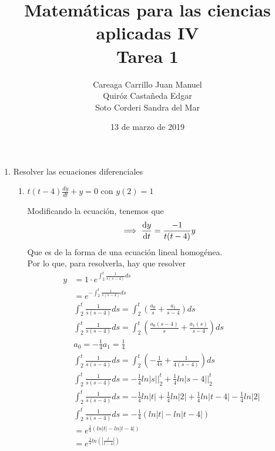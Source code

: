 \documentclass[14pt]{extarticle}
\begin{document}
    \title{
        Matemáticas para las ciencias aplicadas IV\\
        Tarea 1
    }
    \author{
        Careaga Carrillo Juan Manuel\\
        Quiróz Castañeda Edgar\\
        Soto Corderi Sandra del Mar
    }
    \date{13 de marzo de 2019}
    \maketitle
    \thispagestyle{empty}
    \pagebreak
    \begin{enumerate}
        \item {
            Resolver las ecuaciones diferenciales
            \begin{enumerate}
                \item {
                    $t(t-4)\frac{dy}{dt} + y = 0$
                    con $y(2)=1$

                    \color{azul}
                     Modificando la ecuación, tenemos que
                    \begin{align*}
                    &\implies \dv{y}{t} = \frac{-1}{t(t-4)}y
                    \end{align*}
                    Que es de la forma de una ecuación lineal homogénea.\\[.3cm]

                    Por lo que, para resolverla, hay que resolver
                    \begin{align*}
                    y&= 1 \cdot e ^{\int _{2}^{t} \frac{1}{s(s-4)}ds} \\[.3cm]
                  	&= e ^{-\int _{2}^{t} \frac{1}{s(s-4)}ds}\\[.3cm]
                  	&\int _{2}^{t} \frac{1}{s(s-4)} ds = \int _{2}^{t} (\frac{a_{0}}{s} + \frac{a_{1}}{s-4})ds\\[.3cm]
                  	&\int _{2}^{t} \frac{1}{s(s-4)} ds = \int _{2}^{t} (\frac{a_{0} (s-4)}{s} + \frac{a_{1}(s)}{s-4})ds\\[.3cm]
                  	&a_{0} = -\frac{1}{4} a_{1} = \frac{1}{4}\\[.3cm]
                  	&\int _{2}^{t} \frac{1}{s(s-4)} ds = \int _{2}^{t} (-\frac{1}{4s} + \frac{1}{4(s-4)})ds\\[.3cm]
                  	& \int _{2}^{t} \frac{1}{s(s-4)} ds = -\frac{1}{4} ln|s| \Big|_{2}^{t} + \frac{1}{4} ln|s-4| \Big|_{2}^{t}\\[.3cm]
                  	& \int _{2}^{t} \frac{1}{s(s-4)} ds = -\frac{1}{4} ln|t| + \frac{1}{4} ln|2| + \frac{1}{4} ln|t-4| -\frac{1}{4} ln|2|\\[.3cm]
                  	& \int _{2}^{t} \frac{1}{s(s-4)} ds = -\frac{1}{4} (ln|t| - ln|t-4|)\\[.3cm]
                  	& = e^{\frac{1}{4} (ln|t| - ln|t-4|) }\\[.3cm]
                  	& = e^{\frac{1}{4} ln(|\frac{t}{t-4}|) }
                    \end{align*}

}
\end{enumerate}}
\end{enumerate}
\end{document}
